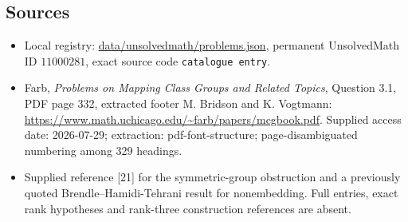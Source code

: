 \documentclass[11pt]{article}
\begin{document}
\subsection{Sources}
\begin{itemize}
\item Local registry: \url{data/unsolvedmath/problems.json}, permanent UnsolvedMath ID $11000281$, exact source code \texttt{catalogue entry}.
\item Farb, \emph{Problems on Mapping Class Groups and Related Topics}, Question 3.1, PDF page 332, extracted footer M. Bridson and K. Vogtmann: \url{https://www.math.uchicago.edu/~farb/papers/mcgbook.pdf}. Supplied access date: 2026-07-29; extraction: pdf-font-structure; page-disambiguated numbering among 329 headings.
\item Supplied reference [21] for the symmetric-group obstruction and a previously quoted Brendle--Hamidi-Tehrani result for nonembedding. Full entries, exact rank hypotheses and rank-three construction references are absent.
\end{itemize}
\end{document}

